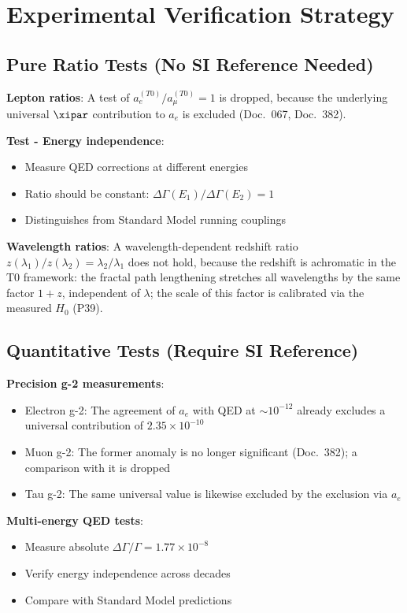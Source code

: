 	\section{Experimental Verification Strategy}
	
	\subsection{Pure Ratio Tests (No SI Reference Needed)}
	
	\textbf{Lepton ratios}: A test of $a_e^{(T0)}/a_{\mu}^{(T0)} = 1$ is dropped, because the underlying universal $\xipar$ contribution to $a_e$ is excluded (Doc.~067, Doc.~382).
	
	\textbf{Test - Energy independence}:
	\begin{itemize}
		\item Measure QED corrections at different energies
		\item Ratio should be constant: $\Delta\Gamma(E_1)/\Delta\Gamma(E_2) = 1$
		\item Distinguishes from Standard Model running couplings
	\end{itemize}
	
	\textbf{Wavelength ratios}: A wavelength-dependent redshift ratio $z(\lambda_1)/z(\lambda_2) = \lambda_2/\lambda_1$ does not hold, because the redshift is achromatic in the T0 framework: the fractal path lengthening stretches all wavelengths by the same factor $1+z$, independent of $\lambda$; the scale of this factor is calibrated via the measured $H_0$ (P39).
	
	\subsection{Quantitative Tests (Require SI Reference)}
	
	\textbf{Precision g-2 measurements}:
	\begin{itemize}
		\item Electron g-2: The agreement of $a_e$ with QED at $\sim10^{-12}$ already excludes a universal contribution of $2.35 \times 10^{-10}$
		\item Muon g-2: The former anomaly is no longer significant (Doc.~382); a comparison with it is dropped
		\item Tau g-2: The same universal value is likewise excluded by the exclusion via $a_e$
	\end{itemize}
	
	\textbf{Multi-energy QED tests}:
	\begin{itemize}
		\item Measure absolute $\Delta\Gamma/\Gamma = 1.77 \times 10^{-8}$
		\item Verify energy independence across decades
		\item Compare with Standard Model predictions
	\end{itemize}
	
